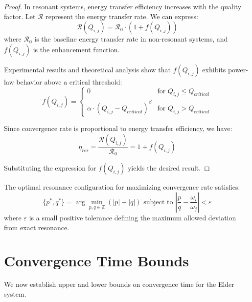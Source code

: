 \begin{proof}
In resonant systems, energy transfer efficiency increases with the quality factor. Let $\mathcal{R}$ represent the energy transfer rate. We can express:
\begin{equation}
\mathcal{R}(Q_{i,j}) = \mathcal{R}_0 \cdot \left(1 + f(Q_{i,j})\right)
\end{equation}
where $\mathcal{R}_0$ is the baseline energy transfer rate in non-resonant systems, and $f(Q_{i,j})$ is the enhancement function.

Experimental results and theoretical analysis show that $f(Q_{i,j})$ exhibits power-law behavior above a critical threshold:
\begin{equation}
f(Q_{i,j}) = 
\begin{cases}
0 & \text{for } Q_{i,j} \leq Q_{critical} \\
\alpha \cdot (Q_{i,j} - Q_{critical})^{\beta} & \text{for } Q_{i,j} > Q_{critical}
\end{cases}
\end{equation}

Since convergence rate is proportional to energy transfer efficiency, we have:
\begin{equation}
\eta_{res} = \frac{\mathcal{R}(Q_{i,j})}{\mathcal{R}_0} = 1 + f(Q_{i,j})
\end{equation}

Substituting the expression for $f(Q_{i,j})$ yields the desired result.
\end{proof}

\begin{corollary}
The optimal resonance configuration for maximizing convergence rate satisfies:
\begin{equation}
\{p^*,q^*\} = \arg\min_{p,q \in \mathbb{Z}} (|p| + |q|) \text{ subject to } \left|\frac{p}{q} - \frac{\omega_i}{\omega_j}\right| < \varepsilon
\end{equation}
where $\varepsilon$ is a small positive tolerance defining the maximum allowed deviation from exact resonance.
\end{corollary}

\section{Convergence Time Bounds}



We now establish upper and lower bounds on convergence time for the Elder system.

